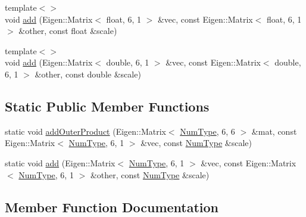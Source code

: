\begin{DoxyCompactItemize}
\item 
{\footnotesize template$<$$>$ }\\void \mbox{\hyperlink{classdvo_1_1core_1_1_math_sse_a942e37dc174d6ed03a48fcb9e9b53b88}{add}} (Eigen\+::\+Matrix$<$ float, 6, 1 $>$ \&vec, const Eigen\+::\+Matrix$<$ float, 6, 1 $>$ \&other, const float \&scale)
\item 
{\footnotesize template$<$$>$ }\\void \mbox{\hyperlink{classdvo_1_1core_1_1_math_sse_a569d441b55c932cf1220a93ef5f155f3}{add}} (Eigen\+::\+Matrix$<$ double, 6, 1 $>$ \&vec, const Eigen\+::\+Matrix$<$ double, 6, 1 $>$ \&other, const double \&scale)
\end{DoxyCompactItemize}
\subsection*{Static Public Member Functions}
\begin{DoxyCompactItemize}
\item 
static void \mbox{\hyperlink{classdvo_1_1core_1_1_math_sse_af3aa0fc81f7709b6f12e3d771741e469}{add\+Outer\+Product}} (Eigen\+::\+Matrix$<$ \mbox{\hyperlink{namespacedvo_1_1core_ab9c199d221775a923e2549ad7e15c323}{Num\+Type}}, 6, 6 $>$ \&mat, const Eigen\+::\+Matrix$<$ \mbox{\hyperlink{namespacedvo_1_1core_ab9c199d221775a923e2549ad7e15c323}{Num\+Type}}, 6, 1 $>$ \&vec, const \mbox{\hyperlink{namespacedvo_1_1core_ab9c199d221775a923e2549ad7e15c323}{Num\+Type}} \&scale)
\item 
static void \mbox{\hyperlink{classdvo_1_1core_1_1_math_sse_a762ff763ee60cc18d6e5bc9197b601a5}{add}} (Eigen\+::\+Matrix$<$ \mbox{\hyperlink{namespacedvo_1_1core_ab9c199d221775a923e2549ad7e15c323}{Num\+Type}}, 6, 1 $>$ \&vec, const Eigen\+::\+Matrix$<$ \mbox{\hyperlink{namespacedvo_1_1core_ab9c199d221775a923e2549ad7e15c323}{Num\+Type}}, 6, 1 $>$ \&other, const \mbox{\hyperlink{namespacedvo_1_1core_ab9c199d221775a923e2549ad7e15c323}{Num\+Type}} \&scale)
\end{DoxyCompactItemize}


\subsection{Member Function Documentation}
\mbox{\label{classdvo_1_1core_1_1_math_sse_a762ff763ee60cc18d6e5bc9197b601a5}} 
